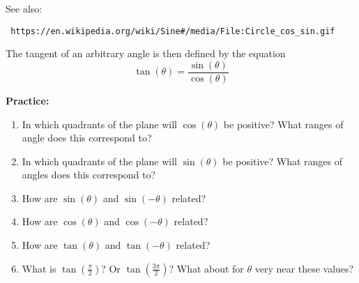 \documentclass{article}
\begin{document}
See also: \begin{verbatim} https://en.wikipedia.org/wiki/Sine#/media/File:Circle_cos_sin.gif\end{verbatim}

The tangent of an arbitrary angle is then defined by the equation
\[\tan(\theta)=\frac{\sin(\theta)}{\cos(\theta)}\]

\vfill


\clearpage








{\bf Practice:}

\vspace{5mm}

\begin{center}
\end{center}



\begin{enumerate}
\item In which quadrants of the plane will $\cos(\theta)$ be positive? What ranges of angle does this correspond to?
\item In which quadrants of the plane will $\sin(\theta)$ be positive? What ranges of angles does this correspond to?
\item How are $\sin(\theta)$ and $\sin(-\theta)$ related?
\item How are $\cos(\theta)$ and $\cos(-\theta)$ related?
\item How are $\tan(\theta)$ and $\tan(-\theta)$ related?
\item What is $\tan\left(\frac{\pi}{2}\right)$? Or $\tan\left(\frac{3\pi}{2}\right)$? What about for $\theta$ very near these values?
\end{enumerate}
\end{document}
